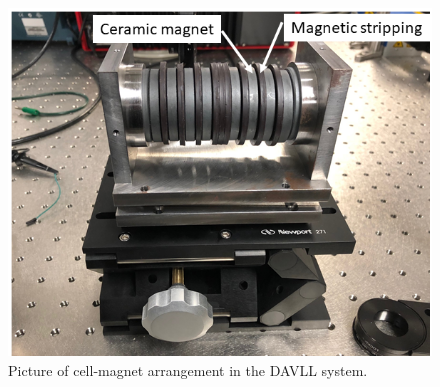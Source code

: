 \begin{figure}[h]
\centering
\includegraphics[width=0.7\linewidth]{figures/magnet.png}
\caption{Picture of cell-magnet arrangement in the DAVLL system.\label{fig:magnet}}
\end{figure}

